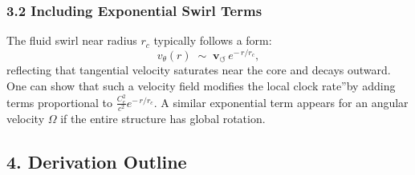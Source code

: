 \documentclass[a4paper,12pt]{article}
\begin{document}
\subsubsection*{3.2 Including Exponential Swirl Terms}

The fluid swirl near radius \(r_c\) typically follows a form:
\[
    v_{\theta}(r)
    \;\sim\;
    \mathbf{v}_{\scriptscriptstyle\boldsymbol{\circlearrowleft}} \,e^{-\,r/r_c},
\]
reflecting that tangential velocity saturates near the core and decays outward. One can show that such a velocity field modifies the local \grqq clock rate\textquotedblright by adding terms proportional to \(\tfrac{C_e^2}{c^2} e^{-\,r/r_c}\). A similar exponential term appears for an angular velocity \(\Omega\) if the entire structure has global rotation.

\subsection*{4. Derivation Outline}
\end{document}
